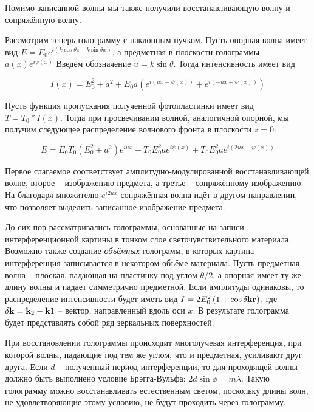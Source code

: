 \noindent
Помимо записанной волны мы также получили восстанавливающую волну и сопряжённую волну.

Рассмотрим теперь голограмму с наклонным пучком. Пусть опорная волна имеет вид $E = E_0 e^{i \left( k \cos \theta z + k \sin \theta x \right)}$, а предметная в плоскости голограммы -- $a(x) e^{i \psi(x)}$ Введём обозначение $u = k \sin \theta$. Тогда интенсивность имеет вид

\begin{equation}
    I(x) = E_0^2 + a^2 + E_0 a \left( e^{i \left( u x - \psi(x) \right)} + e^{i \left( - u x + \psi(x) \right)} \right)
\end{equation}

\noindent
Пусть функция пропускания полученной фотопластинки имеет вид $T = T_0 * I(x)$. Тогда при просвечивании волной, аналогичной опорной, мы получим следующее распределение волнового фронта в плоскости $z = 0$:

\begin{equation}
    E = E_0 T_0 (E_0^2 + a^2) e^{i u x} + T_0 E_0^2 a e^{i \psi(x)} + T_0 E_0^2 a e^{i \left( 2 u x - \psi(x) \right)}
\end{equation}

\noindent
Первое слагаемое соответствует амплитудно-модулированной восстанавливающей волне, второе -- изображению предмета, а третье -- сопряжённому изображению. На благодаря множителю $e^{i 2 u x}$ сопряжённая волна идёт в другом направлении, что позволяет выделить записанное изображение предмета.

До сих пор рассматривались голограммы, основанные на записи интерференционной картины в тонком слое светочувствительного материала. Возможно также создание \textit{объёмных} голограмм, в которых картина интерференция записывается в некотором объёме материала. Пусть предметная волна -- плоская, падающая на пластинку под углом $\theta / 2$, а опорная имеет ту же длину волны и падает симметрично предметной. Если амплитуды одинаковы, то распределение интенсивности будет иметь вид $I = 2 E_0^2 \left( 1 + \cos \delta \mathbf k \mathbf r \right)$, где $\delta \mathbf k = \mathbf k_2 - \mathbf k 1$ -- вектор, направленный вдоль оси $x$. В результате голограмма будет представлять собой ряд зеркальных поверхностей.

При восстановлении голограммы происходит многолучевая интерференция, при которой волны, падающие под тем же углом, что и предметная, усиливают друг друга. Если $d$ -- полученный период интерференции, то для проходящей волны должно быть выполнено условие Брэгга-Вульфа: $2 d \sin \phi = m \lambda$. Такую голограмму можно восстанавливать естественным светом, поскольку длины волн, не удовлетворяющие этому условию, не будут проходить через голограмму.